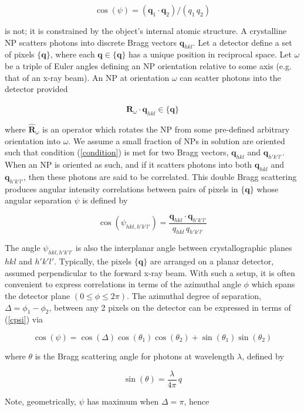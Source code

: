\documentclass [11pt,fleqn]{article}
\def \be {\begin{equation}}
\def \ee {\end{equation}}
\begin{document}
\be \label{cpsi}
\cos (\psi) = (\bm q_1 \cdot \bm q_2)/(q_1 \, q_2 )
\ee

 is not; it is constrained by the object's internal atomic structure. A crystalline NP scatters photons into discrete Bragg vectors $\bm q_{hkl}$. Let a detector define  a set of pixels $\{\bm q\}$, where each $\bm q \in \{\bm q\}$ has a unique position in reciprocal space. Let $\omega$ be a triple of Euler angles defining an NP orientation relative to some axis (e.g. that of an x-ray beam). An NP at orientation $\omega$ can scatter photons into the detector provided 

\be \label{condition}
\hat{\bm R}_\omega \cdot \bm q_{hkl} \in \{\bm q\}
\ee

where $\hat{\bm R}_\omega$ is an operator which rotates the NP from some pre-defined arbitrary orientation into $\omega$. We assume a small fraction of NPs in solution are oriented such that condition (\ref{condition}) is met for two Bragg vectors, $\bm q_{hkl}$ and $\bm q_{h'k'l'}$. When an NP is oriented as such, and if it scatters photons into both $\bm q_{hkl}$ and $\bm q_{h'k'l'}$, then these photons are said to be correlated. This double Bragg scattering produces angular intensity correlations between pairs of pixels in $\{\bm q\}$ whose angular separation $\psi$ is defined by

\be \label{hklcorr}
\cos(\psi_{hkl,h'k'l'}) =\frac{ \bm q_{hkl} \cdot \bm q_{h'k'l'} } {q_{hkl}\, q_{h'k'l'}} 
\ee

The angle $\psi_{hkl,h'k'l'}$ is also the interplanar angle between crystallographic planes $hkl$ and $h'k'l'$. Typically, the pixels $\{\bm q\}$ are arranged on a planar detector, assumed perpendicular to the forward x-ray beam. With such a setup, it is often convenient to express correlations in terms of the azimuthal angle $\phi$ which spans the detector plane $(0 \le \phi \le 2\pi)$. The azimuthal degree of separation, $\Delta = \phi_1  - \phi_2$, between any 2 pixels on the detector can be expressed in terms of (\ref{cpsi}) via

\be \label{project}
\cos(\psi) = \cos( \Delta )\cos( \theta_1)\cos(\theta_2) + \sin(\theta_1)\sin(\theta_2)
\ee

where $\theta$ is the Bragg scattering angle for photons at wavelength $\lambda$, defined by

\be
\sin (\theta)   = \frac{ \lambda  }{ 4\pi } \, q
\ee

Note, geometrically, $\psi$ has maximum when $\Delta=\pi$, hence
\end{document}
